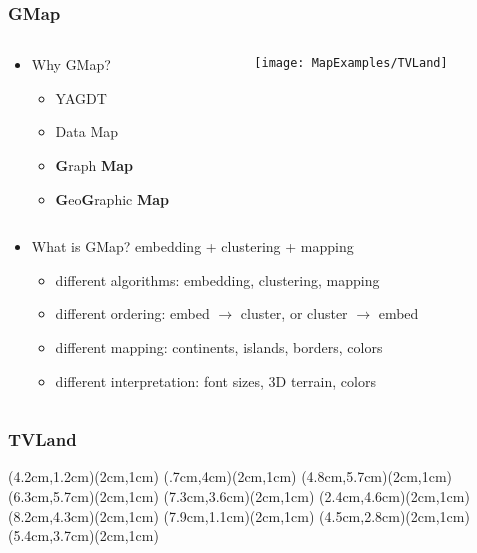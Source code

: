 \documentclass{beamer}
\begin{document}
\begin{frame}[plain]\frametitle{GMap}
\begin{columns}
\begin{column}{8cm}
\begin{itemize}
 \item<1-> Why GMap?
 \begin{itemize}
  \item YAGDT
  \item Data Map
  \item {\bf G}raph {\bf Map}
  \item {\bf G}eo{\bf G}raphic {\bf Map}
 \end{itemize}
\end{itemize}
\end{column}
\begin{column}{4cm}
\hspace{-4cm}\texttt{[image: MapExamples/TVLand]}
\end{column}
\end{columns}

\begin{columns}
\begin{column}{\textwidth}
\begin{itemize}
\item <2->
What is GMap? embedding + clustering + mapping 
 \begin{itemize}
  \item different algorithms: embedding, clustering, mapping
  \item different ordering: embed $\rightarrow$ cluster, or cluster $\rightarrow$ embed
  \item different mapping: continents, islands, borders, colors
  \item different interpretation: font sizes, 3D terrain, colors
 \end{itemize}
\end{itemize}
\end{column}
\begin{column}{1cm}
\end{column}
\end{columns}
\end{frame}






\begin{frame}[plain]\frametitle{TVLand}
\begin{center}
(4.2cm,1.2cm)(2cm,1cm) %
(.7cm,4cm)(2cm,1cm) %
(4.8cm,5.7cm)(2cm,1cm) %
(6.3cm,5.7cm)(2cm,1cm) %
(7.3cm,3.6cm)(2cm,1cm) %
(2.4cm,4.6cm)(2cm,1cm) %
(8.2cm,4.3cm)(2cm,1cm) %
(7.9cm,1.1cm)(2cm,1cm) %
(4.5cm,2.8cm)(2cm,1cm) %
(5.4cm,3.7cm)(2cm,1cm) %
\end{center}
\end{frame}
\end{document}
